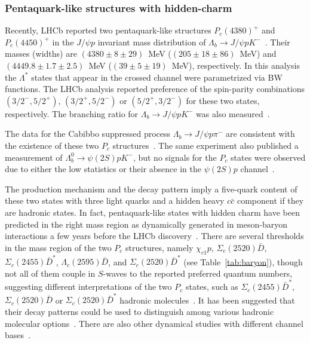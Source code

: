 \subsubsection{Pentaquark-like structures with hidden-charm}

Recently, LHCb reported two pentaquark-like structures $P_c(4380)^+$ and
$P_c(4450)^+$ in the $J/\psi p$ invariant mass distribution of $\Lambda_b\to
J/\psi p K^-$~\cite{Aaij:2015tga}. Their masses (widths) are $(4380\pm 8 \pm
29)$~MeV ($(205\pm 18\pm 86)$~MeV) and $(4449.8\pm 1.7\pm 2.5)$~MeV ($(39\pm
5\pm 19)$~MeV), respectively. In this analysis the $\Lambda^*$ states that
appear in the crossed channel were parametrized via BW functions. The LHCb
analysis reported preference of the spin-parity combinations $(3/2^-, 5/2^+)$,
$(3/2^+, 5/2^-)$ or $(5/2^+, 3/2^-)$  for these two states, respectively. The
branching ratio for $\Lambda_b\to J/\psi p K^-$ was also
measured~\cite{Aaij:2015fea}.


The data for the Cabibbo suppressed process $\Lambda_b\to J/\psi p \pi^-$ are
consistent with the existence of these two $P_c$ structures~\cite{Aaij:2016ymb}.
The same experiment also published a measurement of $\Lambda_b^0\to \psi(2S) p
K^-$, but no signals for the $P_c$ states were observed due to either the low
statistics or their absence in the $\psi(2S)p$ channel~\cite{Aaij:2016wxd}.


The production mechanism and the decay pattern imply a five-quark content of
these two states with three light quarks and a hidden heavy $c\bar{c}$ component
if they are hadronic states. In fact, pentaquark-like states with hidden charm
have been predicted in the right mass region as dynamically generated in
meson-baryon interactions a few years before the LHCb
discovery~\cite{Wu:2010jy,Wu:2010vk}.
There are several thresholds in the mass region of the two $P_c$ structures,
namely $\chi_{c1} p$, $\Sigma_c(2520)\bar{D}$, $\Sigma_c(2455)\bar{D}^*$,
$\Lambda_c(2595)\bar{D}$, and $\Sigma_c(2520)\bar{D}^*$ (see
Table~\ref{tab:baryon}), though not all of them couple in $S$-waves to the
reported preferred quantum numbers, suggesting different interpretations of the
two $P_c$ states, such as $\Sigma_c(2455)\bar{D}^*$, $\Sigma_c(2520)\bar{D}$ or
$\Sigma_c(2520)\bar{D}^*$ hadronic
molecules~\cite{Chen:2015loa,Chen:2015moa,Roca:2015dva,Chen:2016otp,
He:2015cea,Karliner:2015ina,Ortega:2016syt,Shimizu:2016rrd}. It has been suggested that their
decay patterns could be used to distinguish among various hadronic molecular
options~\cite{Wang:2015qlf,Lu:2016nnt,Shen:2016tzq,Lin:2017mtz}.
There are also other dynamical studies with different channel
bases~\cite{Xiao:2016ogq,Yamaguchi:2016ote,Azizi:2016dhy,Geng:2017hxc}.

